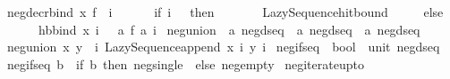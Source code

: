 \begin{isabellebody}
\isanewline
\ \ {\isachardoublequoteopen}neg{\isacharunderscore}{\kern0pt}decr{\isacharunderscore}{\kern0pt}bind\ x\ f\ {\isacharequal}{\kern0pt}\ {\isacharparenleft}{\kern0pt}{\isasymlambda}i{\isachardot}{\kern0pt}\ \isanewline
\ \ \ \ \ if\ i\ {\isacharequal}{\kern0pt}\ {}\ then\isanewline
\ \ \ \ \ \ \ Lazy{\isacharunderscore}{\kern0pt}Sequence{\isachardot}{\kern0pt}hit{\isacharunderscore}{\kern0pt}bound\isanewline
\ \ \ \ \ else\isanewline
\ \ \ \ \ \ \ hb{\isacharunderscore}{\kern0pt}bind\ {\isacharparenleft}{\kern0pt}x\ {\isacharparenleft}{\kern0pt}i\ {\isacharminus}{\kern0pt}\ {}{\isacharparenright}{\kern0pt}{\isacharparenright}{\kern0pt}\ {\isacharparenleft}{\kern0pt}{\isasymlambda}a{\isachardot}{\kern0pt}\ f\ a\ i{\isacharparenright}{\kern0pt}{\isacharparenright}{\kern0pt}{\isachardoublequoteclose}\isanewline
\isanewline
{}\isamarkupfalse%
\ neg{\isacharunderscore}{\kern0pt}union\ {\isacharcolon}{\kern0pt}{\isacharcolon}{\kern0pt}\ {\isachardoublequoteopen}{\isacharprime}{\kern0pt}a\ neg{\isacharunderscore}{\kern0pt}dseq\ {\isasymRightarrow}\ {\isacharprime}{\kern0pt}a\ neg{\isacharunderscore}{\kern0pt}dseq\ {\isasymRightarrow}\ {\isacharprime}{\kern0pt}a\ neg{\isacharunderscore}{\kern0pt}dseq{\isachardoublequoteclose}\isanewline
{}\isanewline
\ \ {\isachardoublequoteopen}neg{\isacharunderscore}{\kern0pt}union\ x\ y\ {\isacharequal}{\kern0pt}\ {\isacharparenleft}{\kern0pt}{\isasymlambda}i{\isachardot}{\kern0pt}\ Lazy{\isacharunderscore}{\kern0pt}Sequence{\isachardot}{\kern0pt}append\ {\isacharparenleft}{\kern0pt}x\ i{\isacharparenright}{\kern0pt}\ {\isacharparenleft}{\kern0pt}y\ i{\isacharparenright}{\kern0pt}{\isacharparenright}{\kern0pt}{\isachardoublequoteclose}\isanewline
\isanewline
{}\isamarkupfalse%
\ neg{\isacharunderscore}{\kern0pt}if{\isacharunderscore}{\kern0pt}seq\ {\isacharcolon}{\kern0pt}{\isacharcolon}{\kern0pt}\ {\isachardoublequoteopen}bool\ {\isasymRightarrow}\ unit\ neg{\isacharunderscore}{\kern0pt}dseq{\isachardoublequoteclose}\isanewline
{}\isanewline
\ \ {\isachardoublequoteopen}neg{\isacharunderscore}{\kern0pt}if{\isacharunderscore}{\kern0pt}seq\ b\ {\isacharequal}{\kern0pt}\ {\isacharparenleft}{\kern0pt}if\ b\ then\ neg{\isacharunderscore}{\kern0pt}single\ {\isacharparenleft}{\kern0pt}{\isacharparenright}{\kern0pt}\ else\ neg{\isacharunderscore}{\kern0pt}empty{\isacharparenright}{\kern0pt}{\isachardoublequoteclose}\isanewline
\isanewline
{}\isamarkupfalse%
\ neg{\isacharunderscore}{\kern0pt}iterate{\isacharunderscore}{\kern0pt}upto\ \isanewline

\end{isabellebody}
